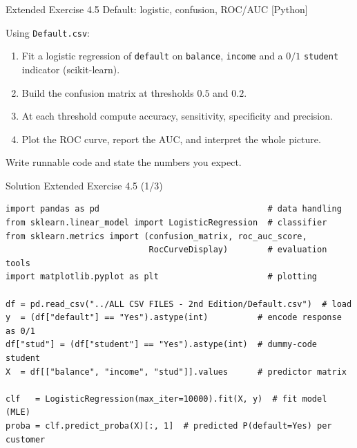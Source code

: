 \documentclass[aspectratio=169,11pt]{beamer}
\begin{document}
\begin{frame}{Extended Exercise 4.5 \textemdash{} Default: logistic, confusion, ROC/AUC [Python]}
\begin{longexercise}
Using \texttt{Default.csv}:
\begin{enumerate}
  \item Fit a logistic regression of \texttt{default} on \texttt{balance},
        \texttt{income} and a $0/1$ \texttt{student} indicator
        (scikit-learn).
  \item Build the confusion matrix at thresholds $0.5$ and $0.2$.
  \item At each threshold compute accuracy, sensitivity, specificity and
        precision.
  \item Plot the ROC curve, report the AUC, and interpret the whole
        picture.
\end{enumerate}
Write runnable code and state the numbers you expect.
\end{longexercise}
\end{frame}

\begin{frame}[fragile]{Solution \textemdash{} Extended Exercise 4.5 (1/3)}
\begin{solutionbox}
\begin{lstlisting}
import pandas as pd                                  # data handling
from sklearn.linear_model import LogisticRegression  # classifier
from sklearn.metrics import (confusion_matrix, roc_auc_score,
                             RocCurveDisplay)        # evaluation tools
import matplotlib.pyplot as plt                      # plotting

df = pd.read_csv("../ALL CSV FILES - 2nd Edition/Default.csv")  # load
y  = (df["default"] == "Yes").astype(int)          # encode response as 0/1
df["stud"] = (df["student"] == "Yes").astype(int)  # dummy-code student
X  = df[["balance", "income", "stud"]].values      # predictor matrix

clf   = LogisticRegression(max_iter=10000).fit(X, y)  # fit model (MLE)
proba = clf.predict_proba(X)[:, 1]  # predicted P(default=Yes) per customer
\end{lstlisting}
\end{solutionbox}
\end{frame}
\end{document}
